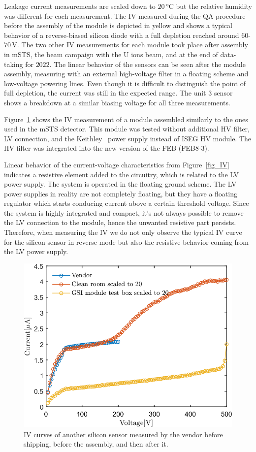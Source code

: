 Leakage current measurements are scaled down to $\SI{20}{\celsius}$ but the relative humidity was different for each measurement. The IV measured during the QA procedure before the assembly of the module is depicted in yellow and shows a typical behavior of a reverse-biased silicon diode with a full depletion reached around $60$-$70$\,V. The two other IV measurements for each module took place after assembly in \gls{mSTS}, the beam campaign with the U ions beam, and at the end of data-taking for $2022$. The linear behavior of the sensors can be seen after the module assembly, measuring with an external high-voltage filter in a floating scheme and low-voltage powering lines. Even though it is difficult to distinguish the point of full depletion, the current was still in the expected range. The unit 3 sensor shows a breakdown at a similar biasing voltage for all three measurements.


Figure~\ref{fig_IV_good} shows the IV measurement of a module assembled similarly to the ones used in the \gls{mSTS} detector. This module was tested without additional \gls{HV} filter, \gls{LV} connection, and the Keithley~\cite{Keithley} power supply instead of ISEG \gls{HV} module. The \gls{HV} filter was integrated into the new version of the \gls{FEB} (FEB8-3).


Linear behavior of the current-voltage characteristics from Figure~\ref{fig_IV} indicates a resistive element added to the circuitry, which is related to the \gls{LV} power supply. The system is operated in the floating ground scheme. The LV power supplies in reality are not completely floating, but they have a floating regulator which starts conducing current above a certain threshold voltage. Since the system is highly integrated and compact, it’s not always possible to remove the LV connection to the module, hence the unwanted resistive part persists. Therefore, when measuring the IV we do not only observe the typical IV curve for the silicon sensor in reverse mode but also the resistive behavior coming from the LV power supply.
\begin{figure}[!h]
\centering
\includegraphics[width=0.5\columnwidth]{Chapter6/DCS/images/IV/30304Whole.png}
\caption{IV curves of another silicon sensor measured by the vendor before shipping, before the assembly, and then after it.} 
\label{fig_IV_good}
\end{figure}
